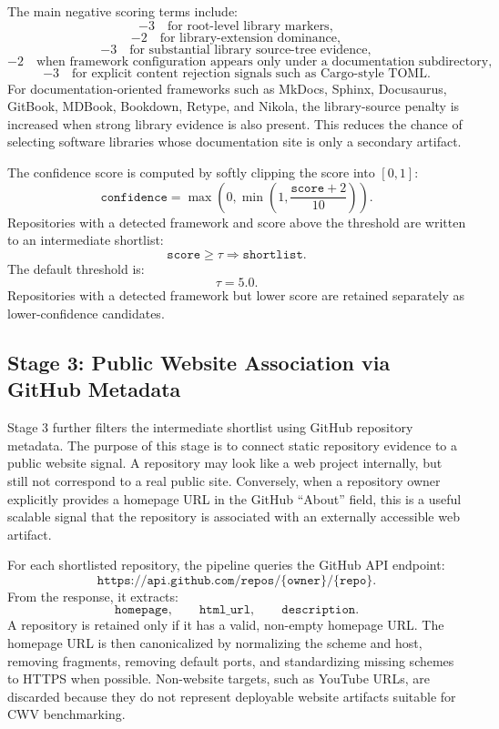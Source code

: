 The main negative scoring terms include:
\[
-3 \quad \text{for root-level library markers},
\]
\[
-2 \quad \text{for library-extension dominance},
\]
\[
-3 \quad \text{for substantial library source-tree evidence},
\]
\[
-2 \quad \text{when framework configuration appears only under a documentation subdirectory},
\]
\[
-3 \quad \text{for explicit content rejection signals such as Cargo-style TOML}.
\]
For documentation-oriented frameworks such as MkDocs, Sphinx, Docusaurus, GitBook, MDBook, Bookdown, Retype, and Nikola, the library-source penalty is increased when strong library evidence is also present. This reduces the chance of selecting software libraries whose documentation site is only a secondary artifact.

The confidence score is computed by softly clipping the score into \([0,1]\):
\[
\texttt{confidence} =
\max\left(0, \min\left(1, \frac{\texttt{score} + 2}{10}\right)\right).
\]
Repositories with a detected framework and score above the threshold are written to an intermediate shortlist:
\[
\texttt{score} \geq \tau \Rightarrow \texttt{shortlist}.
\]
The default threshold is:
\[
\tau = 5.0.
\]
Repositories with a detected framework but lower score are retained separately as lower-confidence candidates.

\subsection{Stage 3: Public Website Association via GitHub Metadata}

Stage 3 further filters the intermediate shortlist using GitHub repository metadata. The purpose of this stage is to connect static repository evidence to a public website signal. A repository may look like a web project internally, but still not correspond to a real public site. Conversely, when a repository owner explicitly provides a homepage URL in the GitHub ``About'' field, this is a useful scalable signal that the repository is associated with an externally accessible web artifact.

For each shortlisted repository, the pipeline queries the GitHub API endpoint:
\[
\texttt{https://api.github.com/repos/\{owner\}/\{repo\}}.
\]
From the response, it extracts:
\[
\texttt{homepage}, \qquad \texttt{html\_url}, \qquad \texttt{description}.
\]
A repository is retained only if it has a valid, non-empty homepage URL. The homepage URL is then canonicalized by normalizing the scheme and host, removing fragments, removing default ports, and standardizing missing schemes to HTTPS when possible. Non-website targets, such as YouTube URLs, are discarded because they do not represent deployable website artifacts suitable for CWV benchmarking.


